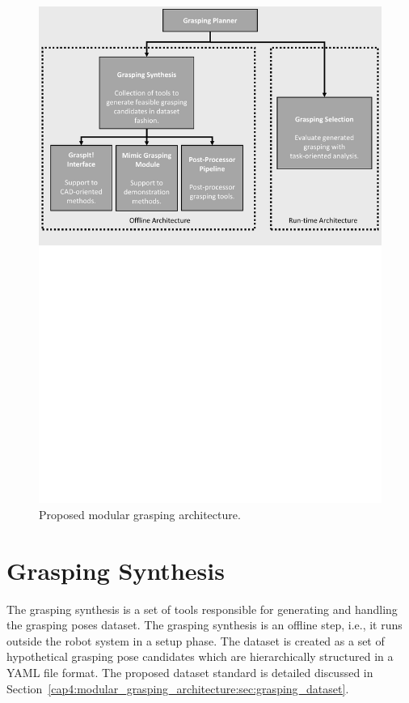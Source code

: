 \begin{figure}[h!]
\begin{tcolorbox}
\centerline{\includegraphics[trim={0cm 15cm 0cm 0cm},clip,width=0.85\linewidth,angle=0]{Cap4/Figuras/grasping_framework.pdf}}
\end{tcolorbox}
\caption{Proposed modular grasping architecture.}
\label{fig:grasping_framework_code}
\end{figure}

\section{Grasping Synthesis}
\label{cap4:modular_grasping_architecture:sec:grasping_synthesis}

The grasping synthesis is a set of tools responsible for generating and handling the grasping poses dataset. The grasping synthesis is an offline step, i.e., it runs outside the robot system in a setup phase. The dataset is created as a set of hypothetical grasping pose candidates which are hierarchically structured in a YAML file format. The proposed dataset standard is detailed discussed in Section~\ref{cap4:modular_grasping_architecture:sec:grasping_dataset}.

